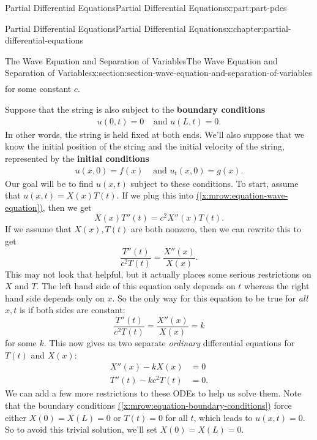 \documentclass[oneside,10pt,]{book}
\newcommand{\xreffont}{\relax}
\newcommand{\terminology}[1]{\textbf{#1}}
\numberwithin{equation}{part}
\newcommand{\amp}{&}
\begin{document}
\begin{partptx}{Partial Differential Equations}{}{Partial Differential Equations}{}{}{x:part:part-pdes}
\begin{chapterptx}{Partial Differential Equations}{}{Partial Differential Equations}{}{}{x:chapter:partial-differential-equations}
\begin{sectionptx}{The Wave Equation and Separation of Variables}{}{The Wave Equation and Separation of Variables}{}{}{x:section:section-wave-equation-and-separation-of-variables}
\begin{align}
\end{align}
for some constant \(c\).%
\par
Suppose that the string is also subject to the \terminology{boundary conditions}%
%
\begin{align}
u(0,t) = 0 \amp\text{ and } u(L,t) = 0\text{.}\label{x:mrow:equation-boundary-conditions}
\end{align}
In other words, the string is held fixed at both ends. We'll also suppose that we know the initial position of the string and the initial velocity of the string, represented by the \terminology{initial conditions}%
%
\begin{align}
u(x,0) = f(x) \amp \text{ and } u_{t}(x,0) = g(x) \text{.}\label{x:mrow:equation-initial-condition}
\end{align}
Our goal will be to find \(u(x,t)\) subject to these conditions. To start, assume that \(u(x,t) = X(x)T(t).\) If we plug this into \hyperref[x:mrow:equation-wave-equation]{({\xreffont\ref{x:mrow:equation-wave-equation}})}, then we get%
%
\begin{equation*}
X(x)T''(t) = c^{2}X''(x)T(t).
\end{equation*}
If we assume that \(X(x),T(t)\) are both nonzero, then we can rewrite this to get%
\begin{equation*}
\frac{T''(t)}{c^{2}T(t)} = \frac{X''(x)}{X(x)}.
\end{equation*}
This may not look that helpful, but it actually places some serious restrictions on \(X\) and \(T\). The left hand side of this equation only depends on \(t\) whereas the right hand side depends only on \(x\). So the only way for this equation to be true for \emph{all} \(x,t\) is if both sides are constant:%
\begin{equation*}
\frac{T''(t)}{c^{2}T(t)} = \frac{X''(x)}{X(x)} = k
\end{equation*}
for some \(k\). This now gives us two separate \emph{ordinary} differential equations for \(T(t)\) and \(X(x)\):%
%
\begin{align}
X''(x) - kX(x) \amp = 0 \label{x:mrow:equation-separation-of-variables-1}\\
T''(t) - kc^{2}T(t) \amp = 0\text{.}\label{x:mrow:equation-separation-of-variables-2}
\end{align}
We can add a few more restrictions to these ODEs to help us solve them. Note that the boundary conditions \hyperref[x:mrow:equation-boundary-conditions]{({\xreffont\ref{x:mrow:equation-boundary-conditions}})} force either \(X(0) = X(L) = 0\) or \(T(t) = 0\) for all \(t\), which leads to \(u(x,t) = 0\). So to avoid this trivial solution, we'll set \(X(0) = X(L) = 0\).%

\end{sectionptx}
\end{chapterptx}
\end{partptx}
\end{document}
